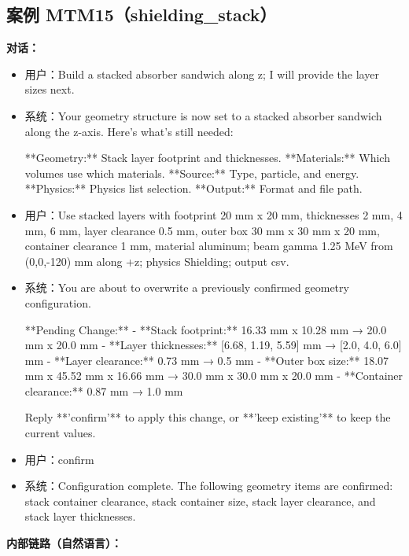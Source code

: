 \documentclass[11pt]{ctexart}
\begin{document}
\subsection{案例 MTM15（shielding\_stack）}
\textbf{对话：}
\begin{itemize}
\item 用户：Build a stacked absorber sandwich along z; I will provide the layer sizes next.
\item 系统：Your geometry structure is now set to a stacked absorber sandwich along the z-axis. Here's what's still needed:

**Geometry:** Stack layer footprint and thicknesses.
**Materials:** Which volumes use which materials.
**Source:** Type, particle, and energy.
**Physics:** Physics list selection.
**Output:** Format and file path.
\item 用户：Use stacked layers with footprint 20 mm x 20 mm, thicknesses 2 mm, 4 mm, 6 mm, layer clearance 0.5 mm, outer box 30 mm x 30 mm x 20 mm, container clearance 1 mm, material aluminum; beam gamma 1.25 MeV from (0,0,-120) mm along +z; physics Shielding; output csv.
\item 系统：You are about to overwrite a previously confirmed geometry configuration.

**Pending Change:**
- **Stack footprint:** 16.33 mm x 10.28 mm → 20.0 mm x 20.0 mm
- **Layer thicknesses:** [6.68, 1.19, 5.59] mm → [2.0, 4.0, 6.0] mm
- **Layer clearance:** 0.73 mm → 0.5 mm
- **Outer box size:** 18.07 mm x 45.52 mm x 16.66 mm → 30.0 mm x 30.0 mm x 20.0 mm
- **Container clearance:** 0.87 mm → 1.0 mm

Reply **'confirm'** to apply this change, or **'keep existing'** to keep the current values.
\item 用户：confirm
\item 系统：Configuration complete. The following geometry items are confirmed: stack container clearance, stack container size, stack layer clearance, and stack layer thicknesses.
\end{itemize}
\textbf{内部链路（自然语言）：}
\end{document}
